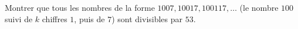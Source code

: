 Montrer que tous les nombres de la forme $1007, 10017, 100117, \ldots$ (le nombre $100$ suivi de $k$ chiffres $1$, puis de $7$) sont divisibles par $53$.
